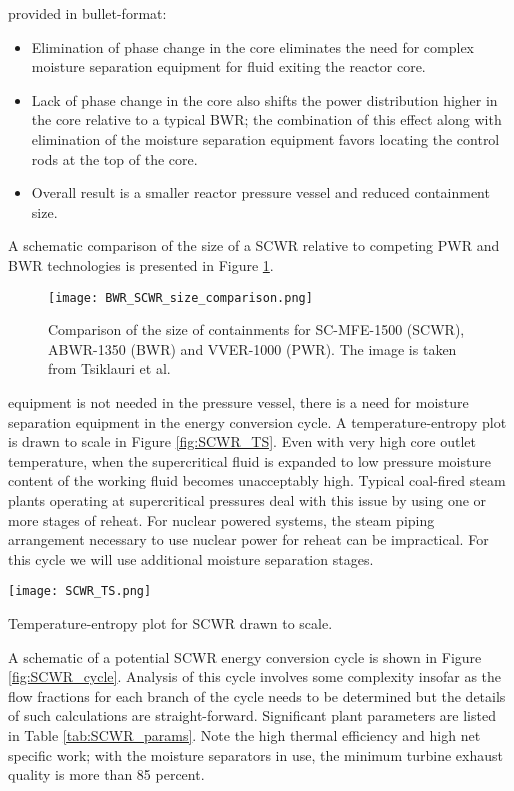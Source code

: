  provided in bullet-format:
\begin{itemize}
\item Elimination of phase change in the core eliminates the need for complex moisture separation equipment for fluid exiting the reactor core.  
\item Lack of phase change in the core also shifts the power distribution higher in the core relative to a typical BWR; the combination of this effect along with elimination of the moisture separation equipment favors locating the control rods at the top of the core.
\item Overall result is a smaller reactor pressure vessel and reduced containment size.
\end{itemize}
A schematic comparison of the size of a SCWR relative to competing PWR and BWR technologies is presented in Figure \ref{fig:SCWR_size}.
\begin{figure}
\texttt{[image: BWR\_SCWR\_size\_comparison.png]}
\caption{Comparison of the size of containments for SC-MFE-1500 (SCWR), ABWR-1350 (BWR) and VVER-1000 (PWR).  The image is taken from Tsiklauri et al.}
\label{fig:SCWR_size}
\end{figure}

 equipment is not needed in the pressure vessel, there is a need for moisture separation equipment in the energy conversion cycle.  A temperature-entropy plot is drawn to scale in Figure \ref{fig:SCWR_TS}.  Even with very high core outlet temperature, when the supercritical fluid is expanded to low pressure moisture content of the working fluid becomes unacceptably high. Typical coal-fired steam plants operating at supercritical pressures deal with this issue by using one or more stages of reheat.  For nuclear powered systems, the steam piping arrangement necessary to use nuclear power for reheat can be impractical. For this cycle we will use additional moisture separation stages. 
\begin{marginfigure}
\texttt{[image: SCWR\_TS.png]}
\caption{Temperature-entropy plot for SCWR drawn to scale.}
\label{fig:SCWR_TS}
\end{marginfigure}
A schematic of a potential SCWR energy conversion cycle is shown in Figure \ref{fig:SCWR_cycle}. Analysis of this cycle involves some complexity insofar as the flow fractions for each branch of the cycle needs to be determined but the details of such calculations are straight-forward.  Significant plant parameters are listed in Table \ref{tab:SCWR_params}.  Note the high thermal efficiency and high net specific work; with the moisture separators in use, the minimum turbine exhaust quality is more than 85 percent.  


